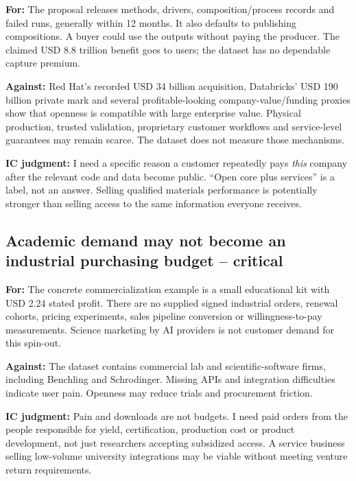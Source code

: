 \documentclass{article}
\begin{document}
\textbf{For:} The proposal releases methods, drivers,
composition/process records and failed runs, generally within 12 months.
It also defaults to publishing compositions. A buyer could use the
outputs without paying the producer. The claimed USD 8.8 trillion
benefit goes to users; the dataset has no dependable capture premium.
\citep{Hoffmann2024Value,InputProposal}

\textbf{Against:} Red Hat's recorded USD 34 billion acquisition,
Databricks' USD 190 billion private mark and several profitable-looking
company-value/funding proxies show that openness is compatible with
large enterprise value. Physical production, trusted validation,
proprietary customer workflows and service-level guarantees may remain
scarce. The dataset does not measure those mechanisms.

\textbf{IC judgment:} I need a specific reason a customer repeatedly
pays \emph{this} company after the relevant code and data become public.
``Open core plus services'' is a label, not an answer. Selling qualified
materials performance is potentially stronger than selling access to the
same information everyone receives.

\subsection{Academic demand may not become an industrial purchasing
budget --
critical}\label{academic-demand-may-not-become-an-industrial-purchasing-budget-critical}

\textbf{For:} The concrete commercialization example is a small
educational kit with USD 2.24 stated profit. There are no supplied
signed industrial orders, renewal cohorts, pricing experiments, sales
pipeline conversion or willingness-to-pay measurements. Science
marketing by AI providers is not customer demand for this spin-out.
\citep{InputBrief,InputRecommendations}

\textbf{Against:} The dataset contains commercial lab and
scientific-software firms, including Benchling and Schrodinger. Missing
APIs and integration difficulties indicate user pain. Openness may
reduce trials and procurement friction.

\textbf{IC judgment:} Pain and downloads are not budgets. I need paid
orders from the people responsible for yield, certification, production
cost or product development, not just researchers accepting subsidized
access. A service business selling low-volume university integrations
may be viable without meeting venture return requirements.
\end{document}
